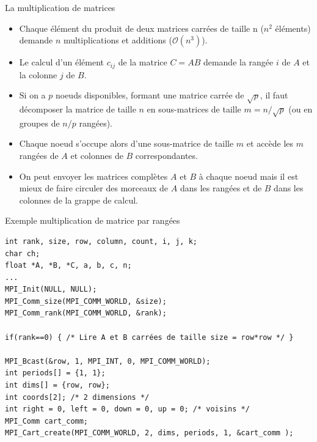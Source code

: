 \documentclass[10pt]{beamer}
\begin{document}
\begin{frame}{La multiplication de matrices}

  \begin{itemize}
    \item Chaque élément du produit de deux matrices carrées de taille n ($n^2$ éléments) demande $n$ multiplications et additions ($\mathcal{O}(n^3)$).

    \item Le calcul d'un élément $c_{ij}$ de la matrice $C = AB$ demande la rangée $i$ de $A$ et la colonne $j$ de $B$.

    \item Si on a $p$ noeuds disponibles, formant une matrice carrée de $\sqrt{p}$, il faut décomposer la matrice de taille $n$ en sous-matrices de taille $m = n/\sqrt{p}$ (ou en groupes de $n/p$ rangées).

    \item Chaque noeud s'occupe alors d'une sous-matrice de taille $m$ et accède les $m$ rangées de $A$ et colonnes de $B$ correspondantes.

    \item On peut envoyer les matrices complètes $A$ et $B$ à chaque noeud mais il est mieux de faire circuler des morceaux de $A$ dans les rangées et de $B$ dans les colonnes de la grappe de calcul.  
  \end{itemize}
\end{frame}

\begin{frame}[fragile]{Exemple multiplication de matrice par rangées}

  \scriptsize
  \begin{verbatim}
int rank, size, row, column, count, i, j, k;
char ch;
float *A, *B, *C, a, b, c, n;
...
MPI_Init(NULL, NULL);
MPI_Comm_size(MPI_COMM_WORLD, &size);
MPI_Comm_rank(MPI_COMM_WORLD, &rank);

if(rank==0) { /* Lire A et B carrées de taille size = row*row */ }

MPI_Bcast(&row, 1, MPI_INT, 0, MPI_COMM_WORLD);
int periods[] = {1, 1};
int dims[] = {row, row};
int coords[2]; /* 2 dimensions */
int right = 0, left = 0, down = 0, up = 0; /* voisins */
MPI_Comm cart_comm;
MPI_Cart_create(MPI_COMM_WORLD, 2, dims, periods, 1, &cart_comm );
  \end{verbatim}
\end{frame}
\end{document}
